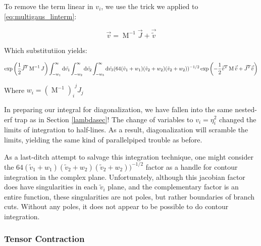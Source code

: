 \documentclass[10pt,letterpaper]{article}
\def\d{{\rm d}}  %
\begin{document}
To remove the term linear in $v_i$, we use the trick we applied to \ref{eq:multigaus_linterm}:

$$\vec{v} = \operatorname{M}^{-1} \vec{J} + \vec{\tilde{v}}$$

Which substitutiion yields:

\begin{equation} 
\exp\left(\frac{1}{2}\vec{J}^T \operatorname{M}^{-1} J\right) \int_{-w_1}^{\infty} \d \tilde{v_1} \int_{-w_2}^{\infty} \d \tilde{v_2} \int_{-w_3}^{\infty} \d \tilde{v_3}  (64 (\tilde{v}_1 + w_1)(\tilde{v}_2 + w_2)(\tilde{v}_2 + w_2))^{-1/2}  \exp\left(-\frac{1}{2} \vec{\tilde{v}}^T \operatorname{M} \vec{\tilde{v}} + \vec{J}^T \vec{\tilde{v}}\right)
\end{equation}

Where $w_i = {(\operatorname{M}^{-1})_i}^j J_j$

In preparing our integral for diagonalization, we have fallen into the same nested-erf trap as in Section \ref{lambdasec}! The change of variables to $v_i = \eta_i^2$ changed the limits of integration to half-lines. As a result, diagonalization will scramble the limits, yielding the same kind of parallelpiped trouble as before.

As a last-ditch attempt to salvage this integration technique, one might consider the $64 (\tilde{v}_1 + w_1)(\tilde{v}_2 + w_2)(\tilde{v}_2 + w_2))^{-1/2}$ factor as a handle for contour integration in the complex plane. Unfortunately, although this jacobian factor does have singularities in each $\tilde{v}_i$ plane, and the complementary factor is an entire function, these singularities are not poles, but rather boundaries of branch cuts. Without any poles, it does not appear to be possible to do contour integration.

\subsubsection{Tensor Contraction}









%    
%    
%
\end{document}
